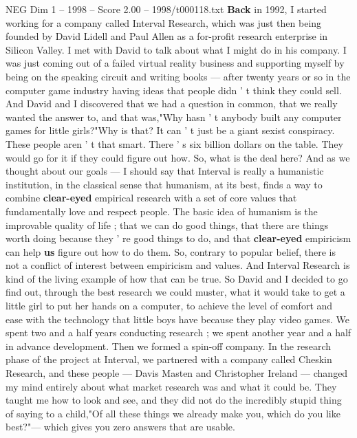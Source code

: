 \begin{textsample}{NEG Dim 1 – 1998 – Score 2.00 – 1998/t000118.txt}  \label{ex:f1_neg_065}
\textbf{Back} in 1992, I started working for a company called Interval Research, which was just then being founded by David Lidell and Paul Allen as a for-profit research enterprise in Silicon Valley.
I met with David to talk about what I might do in his company.
I was just coming out of a failed virtual reality business and supporting myself by being on the speaking circuit and writing books — after twenty years or so in the computer game industry having ideas that people didn ' t think they could sell.
And David and I discovered that we had a question in common, that we really wanted the answer to, and that was,"Why hasn ' t anybody built any computer games for little girls?"Why is that?
It can ' t just be a giant sexist conspiracy.
These people aren ' t that smart.
There ' s six billion dollars on the table.
They would go for it if they could figure out how.
So, what is the deal here?
And as we thought about our goals — I should say that Interval is really a humanistic institution, in the classical sense that humanism, at its best, finds a way to combine \textbf{clear-eyed} empirical research with a set of core values that fundamentally love and respect people.
The basic idea of humanism is the improvable quality of life ; that we can do good things, that there are things worth doing because they ' re good things to do, and that \textbf{clear-eyed} empiricism can help \textbf{us} figure out how to do them.
So, contrary to popular belief, there is not a conflict of interest between empiricism and values.
And Interval Research is kind of the living example of how that can be true.
So David and I decided to go find out, through the best research we could muster, what it would take to get a little girl to put her hands on a computer, to achieve the level of comfort and ease with the technology that little boys have because they play video games.
We spent two and a half years conducting research ; we spent another year and a half in advance development.
Then we formed a spin-off company.
In the research phase of the project at Interval, we partnered with a company called Cheskin Research, and these people — Davis Masten and Christopher Ireland — changed my mind entirely about what market research was and what it could be.
They taught me how to look and see, and they did not do the incredibly stupid thing of saying to a child,"Of all these things we already make you, which do you like best?"— which gives you zero answers that are usable.

\end{textsample}
